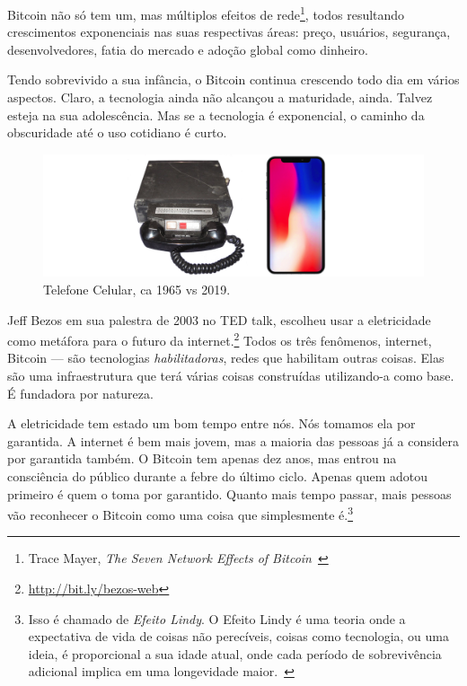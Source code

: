 Bitcoin não só tem um, mas múltiplos efeitos de rede\footnote{Trace Mayer,
  \textit{The Seven Network Effects of Bitcoin}~\cite{7-network-effects}}, todos
resultando crescimentos exponenciais nas suas respectivas áreas: preço, usuários, 
segurança, desenvolvedores, fatia do mercado e adoção global como dinheiro.

Tendo sobrevivido a sua infância, o Bitcoin continua crescendo todo dia em vários aspectos.
Claro, a tecnologia ainda não alcançou a maturidade, ainda. Talvez esteja na sua 
adolescência. Mas se a tecnologia é exponencial, o caminho da obscuridade até 
o uso cotidiano é curto. 

\begin{figure}
  \includegraphics{assets/images/mobile-phone.png}
  \caption{Telefone Celular, ca 1965 vs 2019.}
  \label{fig:mobile-phone}
\end{figure}

Jeff Bezos em sua palestra de 2003 no TED talk, escolheu usar a eletricidade 
como metáfora para o futuro da internet.\footnote{\url{http://bit.ly/bezos-web}} 
Todos os três fenômenos, internet, Bitcoin --- são tecnologias \textit{habilitadoras}, 
redes que habilitam outras coisas. Elas são uma infraestrutura que terá várias coisas construídas utilizando-a como base. É fundadora por natureza.

A eletricidade tem estado um bom tempo entre nós. Nós tomamos ela por garantida.
A internet é bem mais jovem, mas a maioria das pessoas já a considera por 
garantida também. O Bitcoin tem apenas dez anos, mas entrou na consciência 
do público durante a febre do último ciclo. Apenas quem adotou primeiro é 
quem o toma por garantido. Quanto mais tempo passar, mais pessoas vão reconhecer 
o Bitcoin como uma coisa que simplesmente é.\footnote{Isso é chamado de
  \textit{Efeito Lindy}. O Efeito Lindy é uma teoria onde a expectativa 
  de vida de coisas não perecíveis, coisas como tecnologia, ou uma ideia, 
  é proporcional a sua idade atual, onde cada período de sobrevivência adicional 
  implica em uma longevidade maior.~\cite{wiki:lindy}}

